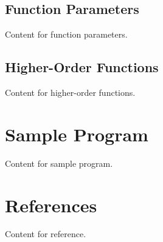 \documentclass[11pt,A4]{article}
\begin{document}
        \subsection{Function Parameters}
        Content for function parameters.
        
        \subsection{Higher-Order Functions}
        Content for higher-order functions.

    \newpage
    \section{Sample Program}
    Content for sample program.

    \newpage
    \section{References}
    Content for reference.
    
\end{document}
